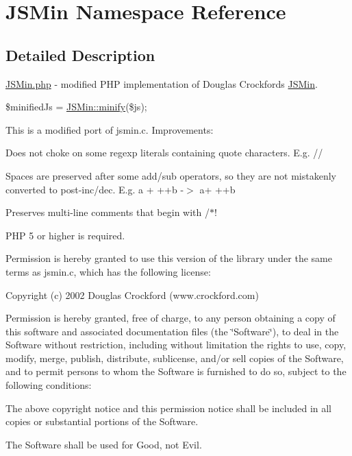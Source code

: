 \hypertarget{namespace_j_s_min}{}\section{J\+S\+Min Namespace Reference}
\label{namespace_j_s_min}


\subsection{Detailed Description}
\hyperlink{_j_s_min_8php}{J\+S\+Min.\+php} -\/ modified P\+HP implementation of Douglas Crockford\textquotesingle{}s \hyperlink{class_j_s_min}{J\+S\+Min}.

{\ttfamily  \$minified\+Js = \hyperlink{class_j_s_min_a3a83b0020e30f40e82dcf9ab4c24c822}{J\+S\+Min\+::minify}(\$js); }

This is a modified port of jsmin.\+c. Improvements\+:

Does not choke on some regexp literals containing quote characters. E.\+g. /\textquotesingle{}/

Spaces are preserved after some add/sub operators, so they are not mistakenly converted to post-\/inc/dec. E.\+g. a + ++b -\/$>$ a+ ++b

Preserves multi-\/line comments that begin with /$\ast$!

P\+HP 5 or higher is required.

Permission is hereby granted to use this version of the library under the same terms as jsmin.\+c, which has the following license\+: 

 Copyright (c) 2002 Douglas Crockford (www.\+crockford.\+com)

Permission is hereby granted, free of charge, to any person obtaining a copy of this software and associated documentation files (the \char`\"{}\+Software\char`\"{}), to deal in the Software without restriction, including without limitation the rights to use, copy, modify, merge, publish, distribute, sublicense, and/or sell copies of the Software, and to permit persons to whom the Software is furnished to do so, subject to the following conditions\+:

The above copyright notice and this permission notice shall be included in all copies or substantial portions of the Software.

The Software shall be used for Good, not Evil.

